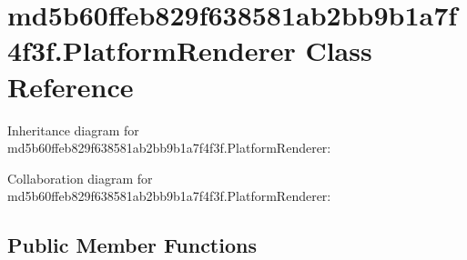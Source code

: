 \hypertarget{classmd5b60ffeb829f638581ab2bb9b1a7f4f3f_1_1_platform_renderer}{}\section{md5b60ffeb829f638581ab2bb9b1a7f4f3f.\+Platform\+Renderer Class Reference}
\label{classmd5b60ffeb829f638581ab2bb9b1a7f4f3f_1_1_platform_renderer}


Inheritance diagram for md5b60ffeb829f638581ab2bb9b1a7f4f3f.\+Platform\+Renderer\+:


Collaboration diagram for md5b60ffeb829f638581ab2bb9b1a7f4f3f.\+Platform\+Renderer\+:
\subsection*{Public Member Functions}
